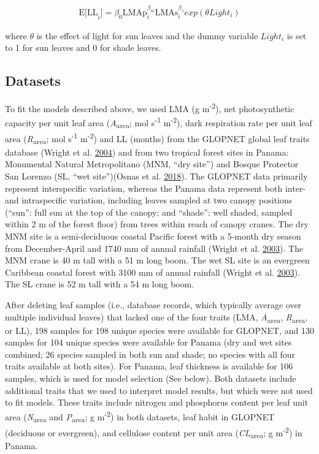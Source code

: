 \documentclass[
  12pt,
]{article}
\begin{document}
\begin{align}
\mathrm{E[LL}_i] = \beta_0\mathrm{LMAp}_{i}^{\beta_m} \mathrm{LMAs}_{i}^{\beta_s} exp(\theta Light_i) \label{eq:E-LL2}
\end{align}

where \(\theta\) is the effect of light for sun leaves and the dummy variable \(Light_i\) is set to 1 for sun leaves and 0 for shade leaves.

\hypertarget{datasets}{%
\subsection{Datasets}\label{datasets}}

To fit the models described above, we used LMA (g m\textsuperscript{-2}), net photosynthetic capacity per unit leaf area (\emph{A}\textsubscript{area}; mol s\textsuperscript{-1} m\textsuperscript{-2}), dark respiration rate per unit leaf area (\emph{R}\textsubscript{area}; mol s\textsuperscript{-1} m\textsuperscript{-2}) and LL (months) from the GLOPNET global leaf traits database (Wright et al. \protect\hyperlink{ref-Wright2004a}{2004}) and from two tropical forest sites in Panama: Monumental Natural Metropolitano (MNM, ``dry site'') and Bosque Protector San Lorenzo (SL, ``wet site'')(Osnas et al. \protect\hyperlink{ref-Osnas2018}{2018}).
The GLOPNET data primarily represent interspecific variation, whereas the Panama data represent both inter- and intraspecific variation, including leaves sampled at two canopy positions (``sun'': full sun at the top of the canopy; and ``shade'': well shaded, sampled within 2 m of the forest floor) from trees within reach of canopy cranes.
The dry MNM site is a semi-deciduous coastal Pacific forest with a 5-month dry season from December-April and 1740 mm of annual rainfall (Wright et al. \protect\hyperlink{ref-Wright2003}{2003}).
The MNM crane is 40 m tall with a 51 m long boom. The wet SL site is an evergreen Caribbean coastal forest with 3100 mm of annual rainfall (Wright et al. \protect\hyperlink{ref-Wright2003}{2003}). The SL crane is 52 m tall with a 54 m long boom.

After deleting leaf samples (i.e., database records, which typically average over multiple individual leaves) that lacked one of the four traits (LMA, \emph{A}\textsubscript{area}, \emph{R}\textsubscript{area}, or LL), 198 samples for 198 unique species were available for GLOPNET, and 130 samples for 104 unique species were available for Panama (dry and wet sites combined; 26 species sampled in both sun and shade; no species with all four traits available at both sites).
For Panama, leaf thickness is available for 106 samples, which is used for model selection (See below).
Both datasets include additional traits that we used to interpret model results, but which were not used to fit models. These traits include nitrogen and phosphorus content per leaf unit area (\emph{N}\textsubscript{area} and \emph{P}\textsubscript{area}; g m\textsuperscript{-2}) in both datasets, leaf habit in GLOPNET (deciduous or evergreen), and cellulose content per unit area (\emph{CL}\textsubscript{area}; g m\textsuperscript{-2}) in Panama.
\end{document}

